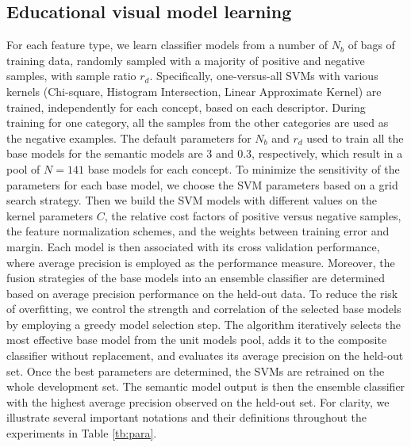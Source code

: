 \documentclass[11pt,twocolumn,twoside]{IEEEtran}
\begin{document}
\subsection{Educational visual model learning}\label{subsec4}
For each feature type, we learn classifier models from a number of $N_{b}$ of bags of training data, randomly
sampled with a majority of positive and negative samples, with sample ratio $r_{d}$.  Specifically, one-versus-all SVMs with various kernels (Chi-square, Histogram Intersection, Linear Approximate Kernel) are trained, independently for each concept, based on each descriptor. During training for one category, all the samples from the
other categories are used as the negative examples. The default parameters for
$N_{b}$ and $r_{d}$ used to train all the base models for the semantic models are 3 and 0.3, respectively, which result in
a pool of $N = 141$ base models for each concept. To minimize the sensitivity of the parameters for each base model, we choose the SVM
parameters based on a grid search strategy. Then we build the SVM models with different values on the kernel parameters $C$, the relative
cost factors of positive versus negative samples, the feature normalization schemes, and the weights between training error and margin.
Each model is then associated with its cross validation performance, where average precision is employed as the performance measure.
Moreover, the fusion strategies of the base models into an ensemble classifier are determined based on average precision performance on the held-out data.
To reduce the risk of overfitting, we control the strength and correlation of the selected base models by employing
a greedy model selection step. The algorithm iteratively selects the most effective base model from the unit models pool, adds it to
the composite classifier without replacement, and evaluates its average precision on the held-out set.
Once the best parameters are determined, the SVMs are retrained on the whole development set. The semantic model output is
then the ensemble classifier with the highest average precision observed on the held-out set. For clarity, we illustrate several important notations and their definitions throughout the experiments in Table \ref{tb:para}.
\end{document}
